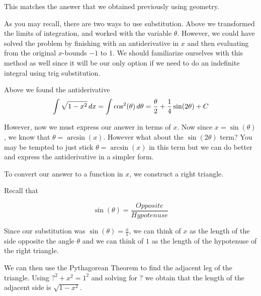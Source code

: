\documentclass{ximera}
\begin{document}
\begin{example}
\begin{explanation}
    This matches the answer that we obtained previously using geometry. 


As you may recall, there are two ways to use substitution. Above we
transformed the limits of integration, and worked with the variable
$\theta$. However, we could have solved the problem by finishing with
an antiderivative in $x$ and then evaluating from the original $x$-bounds $-1$ to $1$. We should
familiarize ourselves with this method as well since it will be our only option if we need to do 
an indefinite integral using trig substitution. 

 Above we found the antiderivative 
\[
\int \sqrt{1-x^{2}} \mathop{}\!d x=\int \cos^{2}(\theta) \mathop{}\!d \theta=\frac{\theta}{2} +\frac{1}{4}\sin(2\theta) + C
\]

    However, now we must express our answer in terms of $x$. Now since $x=\sin(\theta)$, we know
that $\theta=\arcsin(x)$. However what about the $\sin(2\theta)$ term? 
You may be tempted to just stick $\theta=\arcsin(x)$ in this term but we can do better and express the antiderivative
in a simpler form. 
   
    To convert our answer to a function in $x$, we construct a right triangle. 

  Recall that 

\[
\sin(\theta)=\frac{ Opposite}{Hypotenuse}
\]

 Since our substitution was 
$\sin(\theta)=\frac{x}{1}$, we can think of $x$ as the length of the side opposite the angle $\theta$ 
and we can think of $1$ as the length of the hypotenuse of the right triangle. 

    \begin{image}
    \end{image}
   
We can then use the Pythagorean Theorem
to find the adjacent leg of the triangle. Using $?^{2}+x^{2}=1^{2}$ and solving for $?$ we obtain 
that the length of the adjacent side is $\sqrt{1-x^{2}}$. 


\end{explanation}
\end{example}
\end{document}
